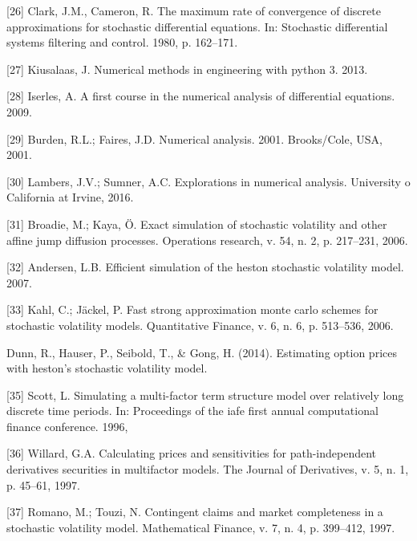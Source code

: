\documentclass[12pt,twoside]{reedthesis}
\theoremstyle{definition}
\theoremstyle{definition}
\theoremstyle{remark}
\begin{document}
  \hypertarget{ref-clark1980maximum}{}
  {[}26{]} Clark, J.M., Cameron, R. The maximum rate of convergence of
  discrete approximations for stochastic differential equations. In:
  Stochastic differential systems filtering and control. 1980, p.
  162--171.
  
  \hypertarget{ref-kiusalaas2013numerical}{}
  {[}27{]} Kiusalaas, J. Numerical methods in engineering with python 3.
  2013.
  
  \hypertarget{ref-iserles}{}
  {[}28{]} Iserles, A. A first course in the numerical analysis of
  differential equations. 2009.
  
  \hypertarget{ref-burden2001}{}
  {[}29{]} Burden, R.L.; Faires, J.D. Numerical analysis. 2001.
  Brooks/Cole, USA, 2001.
  
  \hypertarget{ref-lambers}{}
  {[}30{]} Lambers, J.V.; Sumner, A.C. Explorations in numerical analysis.
  University o California at Irvine, 2016.
  
  \hypertarget{ref-broadie2006exact}{}
  {[}31{]} Broadie, M.; Kaya, Ö. Exact simulation of stochastic volatility
  and other affine jump diffusion processes. Operations research, v. 54,
  n. 2, p. 217--231, 2006.
  
  \hypertarget{ref-andersen}{}
  {[}32{]} Andersen, L.B. Efficient simulation of the heston stochastic
  volatility model. 2007.
  
  \hypertarget{ref-kahl2006fast}{}
  {[}33{]} Kahl, C.; Jäckel, P. Fast strong approximation monte carlo
  schemes for stochastic volatility models. Quantitative Finance, v. 6, n.
  6, p. 513--536, 2006.
  
  \hypertarget{ref-dunn2014estimating}{}
  Dunn, R., Hauser, P., Seibold, T., \& Gong, H. (2014). Estimating option
  prices with heston's stochastic volatility model.
  
  \hypertarget{ref-scott1996}{}
  {[}35{]} Scott, L. Simulating a multi-factor term structure model over
  relatively long discrete time periods. In: Proceedings of the iafe first
  annual computational finance conference. 1996,
  
  \hypertarget{ref-willard1997}{}
  {[}36{]} Willard, G.A. Calculating prices and sensitivities for
  path-independent derivatives securities in multifactor models. The
  Journal of Derivatives, v. 5, n. 1, p. 45--61, 1997.
  
  \hypertarget{ref-romano1997}{}
  {[}37{]} Romano, M.; Touzi, N. Contingent claims and market completeness
  in a stochastic volatility model. Mathematical Finance, v. 7, n. 4, p.
  399--412, 1997.
  
\end{document}
